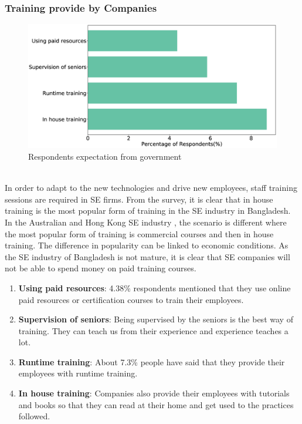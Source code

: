 \subsubsection{Training provide by Companies}
\label{Training provide by Companies}
\begin{figure}[htbp]
\includegraphics[scale=0.28]{Figures/Training.eps} 
\caption{Respondents expectation from government}
\label{fig:company training}
\end{figure}
\hfill\\
In order to adapt to the new technologies and drive new employees, staff training sessions are required in SE firms. From the survey, it is clear that in house training is the most popular form of training in the SE industry in Bangladesh. In the Australian \citep{Ng2004} and Hong Kong\citep{Chan2005} SE industry , the scenario is different where the most popular form of training is commercial courses and then in house training.  The difference in popularity can be linked to economic conditions. As the SE industry of Bangladesh is not mature, it is clear that SE companies will not be able to spend money on paid training courses.

\begin{enumerate}
    \item \textbf{Using paid resources}: 4.38\% respondents mentioned that they use online paid resources or certification courses to train their employees.
    
    \item\textbf{Supervision of seniors}: Being supervised by the seniors is the best way of training. They can teach us from their experience and experience teaches a lot.
    
    \item\textbf{Runtime training}: About 7.3\% people have said that they provide their employees with runtime training.
    
    \item\textbf{In house training}: Companies also provide their employees with tutorials and books so that they can read at their home and get used to the practices followed.
    
\end{enumerate}